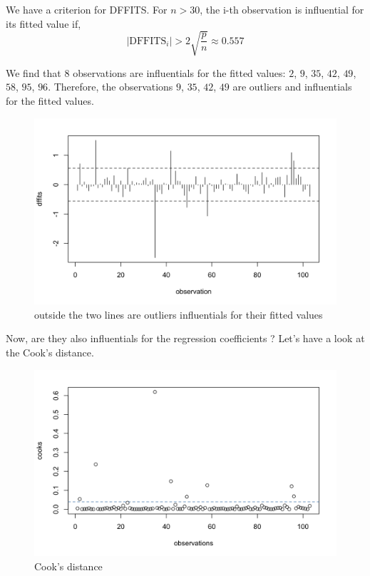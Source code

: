 We have a criterion for DFFITS. For $n > 30$, the i-th observation is influential for its fitted value if, 
\begin{equation}
	|\text{DFFITS}_i| > 2 \sqrt{\frac{p}{n}} \approx 0.557
\end{equation}

We find that $8$ observations are influentials for the fitted values: $2$, $9$, $35$, $42$, $49$, $58$, $95$, $96$. Therefore, the observations $9$, $35$, $42$, $49$ are outliers and influentials for the fitted values.

\begin{figure}[H]
	\centering
	\includegraphics{figures/outliers_influentials_fitted_values.png}
	\caption{outside the two lines are outliers influentials for their fitted values}
	\label{fig}
\end{figure}

Now, are they also influentials for the regression coefficients ? Let's have a look at the Cook's distance.

\begin{figure}[H]
	\centering
	\includegraphics{figures/cooks_distance.png}
	\caption{Cook's distance}
	\label{fig}
\end{figure}

